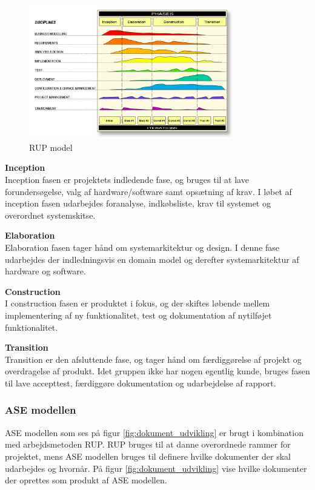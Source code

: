 \begin{figure}[H]
	\centering
	\includegraphics[width=0.80\textwidth]{Billeder/Udviklingsproces/RUP}
	\caption{RUP model}
	\label{fig:rup}
\end{figure}

\textbf{Inception}\\
Inception fasen er projektets indledende fase, og bruges til at lave forundersøgelse, valg af hardware/software samt opsætning af krav. I løbet af inception fasen udarbejdes foranalyse, indkøbsliste, krav til systemet og overordnet systemskitse. 

\textbf{Elaboration}\\
Elaboration fasen tager hånd om systemarkitektur og design. I denne fase udarbejdes der indledningsvis en domain model og derefter systemarkitektur af hardware og software. 

\textbf{Construction}\\
I construction fasen er produktet i fokus, og der skiftes løbende mellem implementering af ny funktionalitet, test og dokumentation af nytilføjet funktionalitet. 

\textbf{Transition}\\
Transition er den afsluttende fase, og tager hånd om færdiggørelse af projekt og overdragelse af produkt. Idet gruppen ikke har nogen egentlig kunde, bruges fasen til lave accepttest, færdiggøre dokumentation og udarbejdelse af rapport. 

\newpage

\subsubsection*{ASE modellen}
ASE modellen som ses på figur \ref{fig:dokument_udvikling} er brugt i kombination med arbejdsmetoden RUP. RUP bruges til at danne overordnede rammer for projektet, mens ASE modellen bruges til definere hvilke dokumenter der skal udarbejdes og hvornår. På figur \ref{fig:dokument_udvikling} vise hvilke dokumenter der oprettes som produkt af ASE modellen. 

